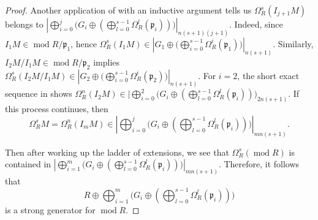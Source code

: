 \documentclass[11pt]{amsart}
\theoremstyle{plain}
\theoremstyle{definition}
\numberwithin{equation}{section}
\numberwithin{theorem}{section}
\begin{document}
\begin{proof}
    Another application of  with an inductive argument tells us $\Omega^s_R (I_{j+1} M)$ belongs to $|\bigoplus^j_{i=0} \big(G_i \oplus (\bigoplus_{l=0}^{s-1} \Omega_R^l (\mathfrak{p}_i)) \big)|_{ n(s+1)(j+1)}$. Indeed, since $I_1 M\in \operatorname{mod}R/\mathfrak{p}_1$, hence $\Omega^s_{R} (I_1 M)\in |G_1 \oplus \big( \bigoplus_{i=0}^{s-1} \Omega_R^i (\mathfrak{p}_1) \big)|_{n(s+1)}$. Similarly, $I_2M/I_1M\in \operatorname{mod} R/\mathfrak{p}_2$ implies $\Omega^s_R (I_2M/I_1M) \in |G_2 \oplus \big( \bigoplus_{i=0}^{s-1} \Omega_R^i (\mathfrak{p}_2) \big)|_{n(s+1)}$. For $i=2$, the short exact sequence in  shows $\Omega^n_R (I_2 M)\in |\bigoplus^2_{i=0} \big(G_i \oplus (\bigoplus_{l=0}^{s-1} \Omega_R^l (\mathfrak{p}_i)) \big)_{2n(s+1)}$. If this process continues, then
    \begin{displaymath}
        \Omega^s_R M=\Omega^n_R(I_m M)\in |\bigoplus^j_{i=0} \big(G_i \oplus (\bigoplus_{l=0}^{s-1} \Omega_R^l (\mathfrak{p}_i)) \big)|_{mn(s+1)}.
    \end{displaymath}
    
    Then after working up the ladder of extensions, we see that $\Omega^s_R (\operatorname{mod}R)$ is contained in $|\bigoplus^m_{i=1} \big(G_i \oplus (\bigoplus_{l=0}^{s-1} \Omega_R^l (\mathfrak{p}_i)) \big)|_{ m n (s+1)}$. Therefore, it follows that
    \begin{displaymath}
        R\oplus \bigoplus^m_{i=1} \big(G_i \oplus (\bigoplus_{l=0}^{s-1} \Omega_R^l (\mathfrak{p}_i)) \big)
    \end{displaymath}
    is a strong generator for $\operatorname{mod}R$.
\end{proof} 
\end{document}
